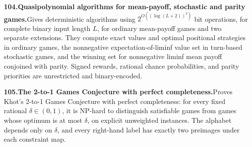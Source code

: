 \documentclass[11pt,a4paper]{article}
\begin{document}
  \par \begin{minipage}{\linewidth}
  \fontsize{10.5}{12.6}\selectfont\RaggedRight
  \hypertarget{result 104}{}
  {\bfseries\textcolor{muted}{104.}\enspace Quasipolynomial algorithms for mean-payoff, stochastic and parity games.}\enspace Gives deterministic algorithms using $2^{O((\log(L+2))^2)}$ bit operations, for complete binary input length $L$, for ordinary mean-payoff games and two separate extensions. They compute exact values and optimal positional strategies in ordinary games, the nonnegative expectation-of-liminf value set in turn-based stochastic games, and the winning set for nonnegative liminf mean payoff conjoined with parity. Signed rewards, rational chance probabilities, and parity priorities are unrestricted and binary-encoded.\par
  \end{minipage}\par\vspace{5pt}



  \par \begin{minipage}{\linewidth}
  \fontsize{10.5}{12.6}\selectfont\RaggedRight
  \hypertarget{result 105}{}
  {\bfseries\textcolor{muted}{105.}\enspace The 2-to-1 Games Conjecture with perfect completeness.}\enspace Proves Khot's 2-to-1 Games Conjecture with perfect completeness: for every fixed rational $\delta\in(0,1)$, it is NP-hard to distinguish satisfiable games from games whose optimum is at most $\delta$, on explicit unweighted instances. The alphabet depends only on $\delta$, and every right-hand label has exactly two preimages under each constraint map.\par
  \end{minipage}\par\vspace{5pt}
\end{document}
